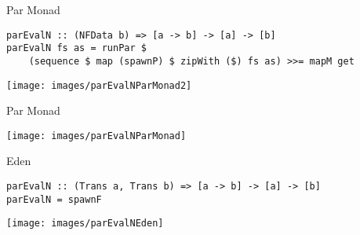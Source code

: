 \begin{frame}[fragile]{Par Monad}
\begin{lstlisting}[frame=htrbl]
parEvalN :: (NFData b) => [a -> b] -> [a] -> [b]
parEvalN fs as = runPar $ 
	(sequence $ map (spawnP) $ zipWith ($) fs as) >>= mapM get
\end{lstlisting}
\begin{center}
	\texttt{[image: images/parEvalNParMonad2]}
\end{center}
\end{frame}

\begin{frame}[fragile]{Par Monad}
\begin{center}
	\texttt{[image: images/parEvalNParMonad]}
\end{center}
\end{frame}

\begin{frame}[fragile]{Eden}
\begin{lstlisting}[frame=htrbl]
parEvalN :: (Trans a, Trans b) => [a -> b] -> [a] -> [b]
parEvalN = spawnF
\end{lstlisting}
\begin{center}
\texttt{[image: images/parEvalNEden]}
\end{center}
\end{frame}